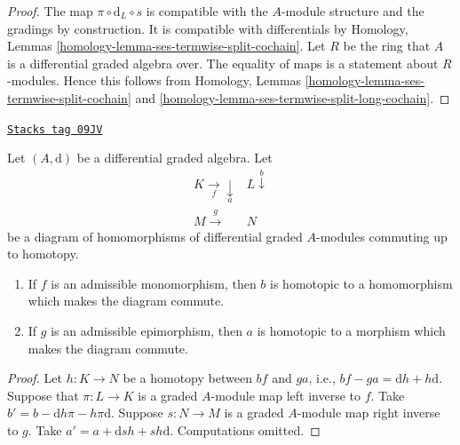 \begin{proof}
The map $\pi \circ \text{d}_L \circ s$ is compatible with the $A$-module
structure and the gradings by construction. It is compatible with
differentials by Homology, Lemmas
\ref{homology-lemma-ses-termwise-split-cochain}.
Let $R$ be the ring that $A$ is a differential graded algebra over.
The equality of maps is a statement about $R$-modules. Hence this
follows from Homology, Lemmas
\ref{homology-lemma-ses-termwise-split-cochain} and
\ref{homology-lemma-ses-termwise-split-long-cochain}.
\end{proof}

\begin{lemma}
\label{dga-lemma-make-commute-map}
\href{https://stacks.math.columbia.edu/tag/09JV}{\texttt{Stacks tag 09JV}}

Let $(A, \text{d})$ be a differential graded algebra. Let
$$
\begin{array}{cc}K \underset{f}{\longrightarrow}\underset{a}{\downarrow} & L \overset{b}{\downarrow} \\ M \overset{g}{\longrightarrow} & N\end{array}
$$
be a diagram of homomorphisms of differential graded $A$-modules
commuting up to homotopy.
\begin{enumerate}
\item If $f$ is an admissible monomorphism, then $b$ is homotopic to a
homomorphism which makes the diagram commute.
\item If $g$ is an admissible epimorphism, then $a$ is homotopic to a
morphism which makes the diagram commute.
\end{enumerate}
\end{lemma}

\begin{proof}
Let $h : K \to N$ be a homotopy between $bf$ and $ga$, i.e.,
$bf - ga = \text{d}h + h\text{d}$. Suppose that $\pi : L \to K$
is a graded $A$-module map left inverse to $f$. Take
$b' = b - \text{d}h\pi - h\pi \text{d}$.
Suppose $s : N \to M$ is a graded $A$-module map right inverse to $g$.
Take $a' = a + \text{d}sh + sh\text{d}$.
Computations omitted.
\end{proof}

